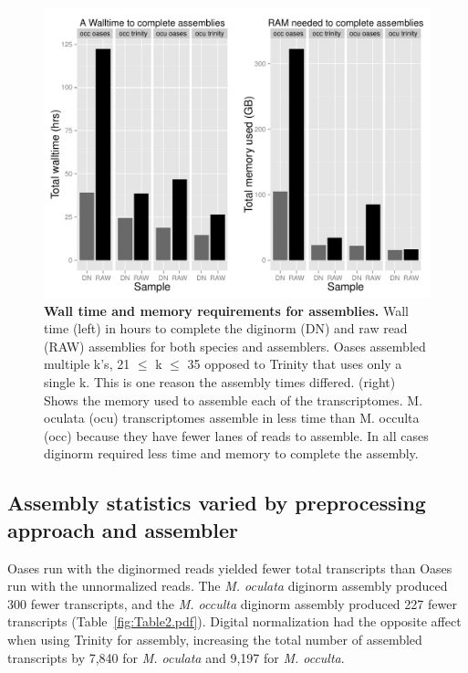 \begin{figure}[tbp]
\centering
\includegraphics[scale=0.5]{manuscript/figure_1_time_and_memory.pdf}
\caption{\textbf{Wall time and memory requirements for assemblies.} Wall time (left) in hours to complete the diginorm (DN) and raw read (RAW) assemblies for both species and assemblers. Oases assembled multiple k's, 21 $\leq$ k $\leq$ 35 opposed to Trinity that uses only a single k. This is one reason the assembly times differed. (right) Shows the memory used to assemble each of the transcriptomes. M. oculata (ocu) transcriptomes assemble in less time than M. occulta (occ) because they have fewer lanes of reads to assemble. In all cases diginorm required less time and memory to complete the assembly.}
\label{fig:time_and_memory.pdf}
\end{figure}
  
\subsection{Assembly statistics varied by preprocessing approach and assembler}
Oases run with the diginormed reads yielded fewer total transcripts than Oases run with the unnormalized reads. The \textit{M. oculata} diginorm assembly produced 300 fewer transcripts, and the \textit{M. occulta} diginorm assembly produced 227 fewer transcripts (Table~\ref{fig:Table2.pdf}). Digital normalization had the opposite affect when using Trinity for assembly, increasing the total number of assembled transcripts by 7,840 for \textit{M. oculata} and 9,197 for \textit{M. occulta}.

